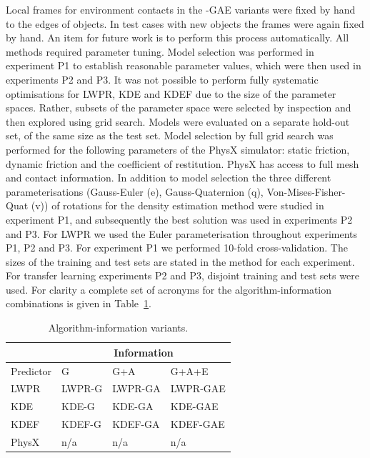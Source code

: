 Local frames for environment contacts in the -GAE variants were fixed
by hand to the edges of objects. In test cases with new objects the
frames were again fixed by hand.  An item for future work is to
perform this process automatically.  All methods required parameter tuning. Model selection was performed in experiment P1 to establish reasonable parameter values, which were then used in experiments P2 and P3.  It was not possible to perform fully systematic optimisations for LWPR, KDE and KDEF due to the size of the parameter spaces.  Rather, subsets of the parameter space were selected by inspection and then explored using grid search.  Models were evaluated on a separate hold-out set, of the same size as the test set. Model selection by full grid search was performed for the following parameters of the PhysX simulator: static friction, dynamic friction and the coefficient of restitution. PhysX has access to full mesh and contact information. In addition to model selection the three different parameterisations (Gauss-Euler (e), Gauss-Quaternion (q), Von-Mises-Fisher-Quat (v)) of rotations for the density estimation method were studied in experiment P1, and subsequently the best solution was used in experiments P2 and P3. For LWPR we used the Euler parameterisation throughout experiments P1, P2 and P3. For experiment P1 we performed 10-fold cross-validation. The sizes of the training and test sets are stated in the method for each experiment. For transfer learning experiments P2 and P3, disjoint training and test sets were used. For clarity a complete set of acronyms for the algorithm-information combinations is given in Table~\ref{tab:algs}. 
\begin{table}[b]
\begin{center}
\label{tab:algs}
\begin{tabular}{|l|l|l|l|}\hline
 & \multicolumn{3}{|c|}{Information} \\ \hline
Predictor & G & G+A & G+A+E \\ \hline
LWPR & LWPR-G& LWPR-GA & LWPR-GAE \\ \hline
KDE & KDE-G & KDE-GA & KDE-GAE \\ \hline
KDEF & KDEF-G & KDEF-GA & KDEF-GAE \\ \hline
PhysX & n/a & n/a & n/a \\ \hline
\end{tabular}
\caption{Algorithm-information variants.}
\end{center}
\end{table}
